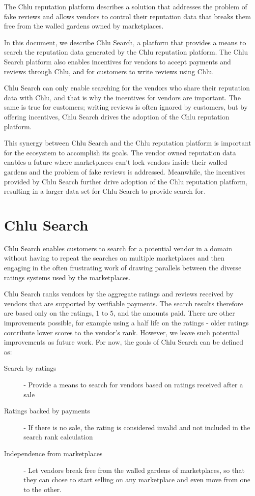 \documentclass[a4paper]{article}
\begin{document}
The Chlu reputation platform\cite{chlu-reputation} describes a
solution that addresses the problem of fake reviews and allows vendors
to control their reputation data that breaks them free from the walled
gardens owned by marketplaces.

In this document, we describe Chlu Search, a platform that provides a
means to search the reputation data generated by the Chlu reputation
platform. The Chlu Search platform also enables incentives for vendors
to accept payments and reviews through Chlu, and for customers to
write reviews using Chlu.

Chlu Search can only enable searching for the vendors who share their
reputation data with Chlu, and that is why the incentives for vendors
are important. The same is true for customers; writing reviews is
often ignored by customers, but by offering incentives, Chlu Search
drives the adoption of the Chlu reputation platform.

This synergy between Chlu Search and the Chlu reputation platform is
important for the ecosystem to accomplish its goals. The vendor owned
reputation data enables a future where marketplaces can't lock vendors
inside their walled gardens and the problem of fake reviews is
addressed. Meanwhile, the incentives provided by Chlu Search further
drive adoption of the Chlu reputation platform, resulting in a larger
data set for Chlu Search to provide search for.

\section{Chlu Search}

Chlu Search enables customers to search for a potential vendor in a
domain without having to repeat the searches on multiple marketplaces
and then engaging in the often frustrating work of drawing parallels
between the diverse ratings systems used by the marketplaces.

Chlu Search ranks vendors by the aggregate ratings and reviews
received by vendors that are supported by verifiable payments. The
search results therefore are based only on the ratings, 1 to 5, and
the amounts paid. There are other improvements possible, for example
using a half life on the ratings - older ratings contribute lower
scores to the vendor's rank. However, we leave such potential
improvements as future work. For now, the goals of Chlu Search can be
defined as:

\begin{description}
\item[Search by ratings] - Provide a means to search for vendors based
  on ratings received after a sale
\item[Ratings backed by payments] - If there is no sale, the rating is
  considered invalid and not included in the search rank calculation
\item[Independence from marketplaces] - Let vendors break free from
  the walled gardens of marketplaces, so that they can chose to start
  selling on any marketplace and even move from one to the other.
\end{description}
\end{document}
